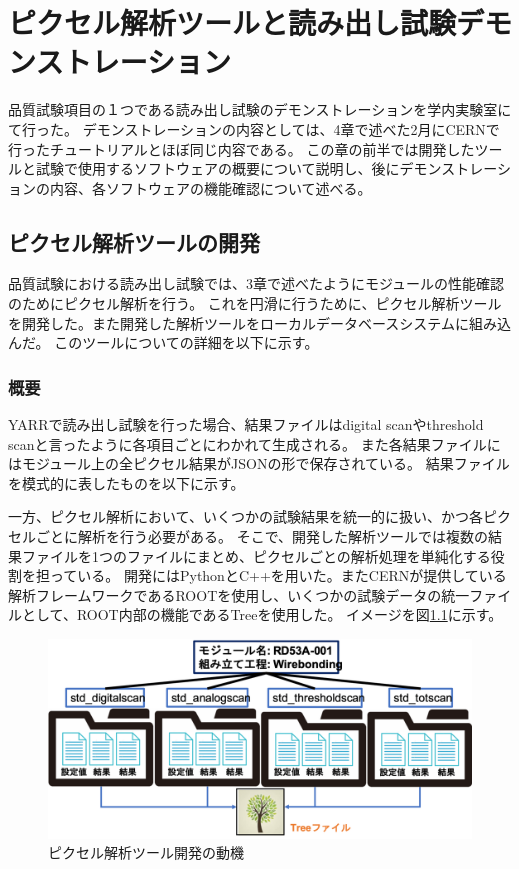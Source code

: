 \chapter{ピクセル解析ツールと読み出し試験デモンストレーション}
品質試験項目の１つである読み出し試験のデモンストレーションを学内実験室にて行った。
デモンストレーションの内容としては、4章で述べた2月にCERNで行ったチュートリアルとほぼ同じ内容である。
この章の前半では開発したツールと試験で使用するソフトウェアの概要について説明し、後にデモンストレーションの内容、各ソフトウェアの機能確認について述べる。

\section{ピクセル解析ツールの開発}
品質試験における読み出し試験では、3章で述べたようにモジュールの性能確認のためにピクセル解析を行う。
これを円滑に行うために、ピクセル解析ツールを開発した。また開発した解析ツールをローカルデータベースシステムに組み込んだ。
このツールについての詳細を以下に示す。

\subsection{概要}
YARRで読み出し試験を行った場合、結果ファイルはdigital scanやthreshold scanと言ったように各項目ごとにわかれて生成される。
また各結果ファイルにはモジュール上の全ピクセル結果がJSONの形で保存されている。
結果ファイルを模式的に表したものを以下に示す。

一方、ピクセル解析において、いくつかの試験結果を統一的に扱い、かつ各ピクセルごとに解析を行う必要がある。
そこで、開発した解析ツールでは複数の結果ファイルを1つのファイルにまとめ、ピクセルごとの解析処理を単純化する役割を担っている。
開発にはPythonとC++を用いた。またCERNが提供している解析フレームワークであるROOTを使用し、いくつかの試験データの統一ファイルとして、ROOT内部の機能であるTreeを使用した。
イメージを図\ref{analysis_tool_motivation}に示す。

\begin{figure}[bpt]\centering
\includegraphics[width=12cm]{analysis_tool_motivation}
\caption[ピクセル解析ツール開発の動機]{ピクセル解析ツール開発の動機}
\label{analysis_tool_motivation}
\end{figure}

